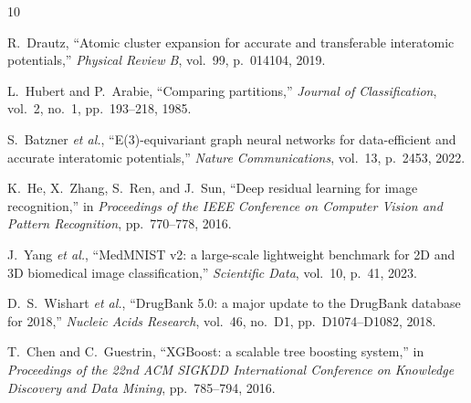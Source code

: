 \begin{thebibliography}{10}

R.~Drautz, ``Atomic cluster expansion for accurate and transferable interatomic potentials,'' \textit{Physical Review B}, vol.~99, p.~014104, 2019.

L.~Hubert and P.~Arabie, ``Comparing partitions,'' \textit{Journal of Classification}, vol.~2, no.~1, pp.~193--218, 1985.

S.~Batzner \textit{et al.}, ``E(3)-equivariant graph neural networks for data-efficient and accurate interatomic potentials,'' \textit{Nature Communications}, vol.~13, p.~2453, 2022.

K.~He, X.~Zhang, S.~Ren, and J.~Sun, ``Deep residual learning for image recognition,'' in \textit{Proceedings of the IEEE Conference on Computer Vision and Pattern Recognition}, pp.~770--778, 2016.

J.~Yang \textit{et al.}, ``MedMNIST v2: a large-scale lightweight benchmark for 2D and 3D biomedical image classification,'' \textit{Scientific Data}, vol.~10, p.~41, 2023.

D.~S.~Wishart \textit{et al.}, ``DrugBank 5.0: a major update to the DrugBank database for 2018,'' \textit{Nucleic Acids Research}, vol.~46, no.~D1, pp.~D1074--D1082, 2018.

T.~Chen and C.~Guestrin, ``XGBoost: a scalable tree boosting system,'' in \textit{Proceedings of the 22nd ACM SIGKDD International Conference on Knowledge Discovery and Data Mining}, pp.~785--794, 2016.

\end{thebibliography}
